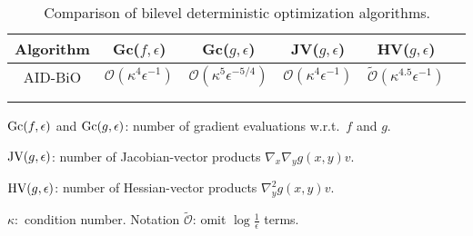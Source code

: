 \documentclass{osudissert96}
\begin{document}
\begin{table*}[!t]
 \centering
 \caption{Comparison of bilevel deterministic optimization algorithms.}
 \vspace{0.1cm}
 \begin{threeparttable}
  \begin{tabular}{|c|c|c|c|c|c|}
   \hline
Algorithm & Gc($f,\epsilon$) & Gc($g,\epsilon$) & JV($g,\epsilon$) &  HV($g,\epsilon$)    \\\hline\hline
AID-BiO \cite{ghadimi2018approximation}  & $\mathcal{O}(\kappa^4\epsilon^{-1})$ & $\mathcal{O}(\kappa^5\epsilon^{-5/4})$ &  $\mathcal{O}\left(\kappa^4\epsilon^{-1}\right)$& $\mathcal{\widetilde O}\left(\kappa^{4.5}\epsilon^{-1}\right)$ \\ \hline
   \cellcolor{blue!15}{AID-BiO (this thesis)} & \cellcolor{blue!15}{$\mathcal{O}(\kappa^3\epsilon^{-1})$} & \cellcolor{blue!15}{$\mathcal{ O}(\kappa^4\epsilon^{-1})$ } & \cellcolor{blue!15}{$\mathcal{O}\left(\kappa^{3}\epsilon^{-1}\right)$} & \cellcolor{blue!15}{ $\mathcal{ O}\left(\kappa^{3.5}\epsilon^{-1}\right)$} \\ \hline
      \cellcolor{blue!15}{ITD-BiO (this thesis)} & \cellcolor{blue!15}{$\mathcal{O}(\kappa^3\epsilon^{-1})$} & \cellcolor{blue!15}{$\mathcal{\widetilde O}(\kappa^4\epsilon^{-1})$ } & \cellcolor{blue!15}{$\mathcal{\widetilde O}\left(\kappa^4\epsilon^{-1}\right)$} & \cellcolor{blue!15}{ $\mathcal{\widetilde O}\left(\kappa^4\epsilon^{-1}\right)$} \\ \hline
  \end{tabular}\label{tab:determinstic}
  \vspace{0.1cm}
        {\small
   \begin{tablenotes}
  \item $\mbox{\normalfont Gc}(f,\epsilon)$ and $\mbox{\normalfont Gc}(g,\epsilon)$: 
 number of gradient evaluations w.r.t.~$f$ and $g$. 
 \item $\mbox{\normalfont JV}(g,\epsilon)$: number of Jacobian-vector products $\nabla_x\nabla_y g(x,y)v$. 
  \item  $\mbox{\normalfont HV}(g,\epsilon)$: number of Hessian-vector products $\nabla_y^2g(x,y) v$.
   \item $\kappa:$ condition number. \; Notation $\mathcal{\widetilde O}$: omit $\log\frac{1}{\epsilon}$ terms.
   \end{tablenotes}}
 \end{threeparttable}
  \vspace{-0.6cm}
\end{table*}
\end{document}
